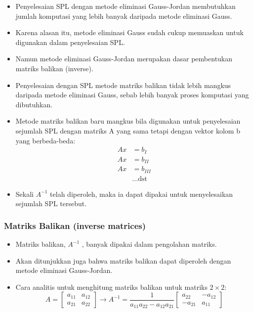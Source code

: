 \documentclass[pdflatex,compress,mathserif]{beamer}
\begin{document}
\begin{frame}
	\begin{itemize}
		\item Penyelesaian SPL dengan metode eliminasi Gauss-Jordan membutuhkan jumlah komputasi yang lebih banyak daripada metode eliminasi Gauss.
		\item Karena alasan itu, metode eliminasi Gauss sudah cukup memuaskan untuk digunakan dalam penyelesaian SPL.
		\item Namun metode eliminasi Gauss-Jordan merupakan dasar pembentukan matriks balikan (inverse).
	\end{itemize}
\end{frame}

\begin{frame}
	\begin{itemize}
		\item Penyelesaian dengan SPL metode matriks balikan tidak lebih mangkus daripada metode eliminasi Gauss, sebab lebih banyak proses komputasi yang dibutuhkan.
		\item Metode matriks balikan baru mangkus bila digunakan untuk penyelesaian sejumlah SPL dengan matriks A yang sama tetapi dengan vektor kolom b yang berbeda-beda:
		\begin{align*}
			Ax &= b_I \\
			Ax &= b_{II} \\
			Ax &= b_{III} \\
			&\dots \text{dst}
		\end{align*}
		\item Sekali $ A^{-1} $ telah diperoleh, maka ia dapat dipakai untuk
		menyelesaikan sejumlah SPL tersebut.
	\end{itemize}
\end{frame}

\begin{frame}
	\frametitle{Matriks Balikan (inverse matrices)}
	\begin{itemize}
		\item Matriks balikan, $ A^{-1} $ , banyak dipakai dalam pengolahan
		matriks.
		\item Akan ditunjukkan juga bahwa matriks balikan dapat diperoleh dengan metode eliminasi Gauss-Jordan.
		\item Cara analitis untuk menghitung matriks balikan untuk matriks $2 \times 2$:
		\[
		A = 
		\begin{bmatrix}
			a_{11} & a_{12} \\ a_{21} & a_{22}
		\end{bmatrix}
		\rightarrow A^{-1} = \frac{1}{a_{11}a_{22} - a_{12}a_{21}}
		\begin{bmatrix}
			a_{22} & -a_{12} \\ -a_{21} & a_{11}
		\end{bmatrix}
		\]
	\end{itemize}
\end{frame}
\end{document}
